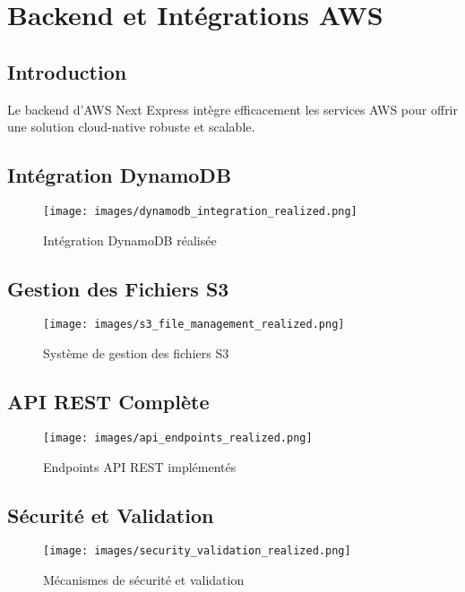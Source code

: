\section{Backend et Intégrations AWS}

\subsection{Introduction}

Le backend d'AWS Next Express intègre efficacement les services AWS pour offrir une solution cloud-native robuste et scalable.

\subsection{Intégration DynamoDB}

\begin{figure}[H]
    \centering
    \texttt{[image: images/dynamodb\_integration\_realized.png]}
    \caption{Intégration DynamoDB réalisée}
    \label{fig:dynamodb_integration}
\end{figure}

\subsection{Gestion des Fichiers S3}

\begin{figure}[H]
    \centering
    \texttt{[image: images/s3\_file\_management\_realized.png]}
    \caption{Système de gestion des fichiers S3}
    \label{fig:s3_management}
\end{figure}

\subsection{API REST Complète}

\begin{figure}[H]
    \centering
    \texttt{[image: images/api\_endpoints\_realized.png]}
    \caption{Endpoints API REST implémentés}
    \label{fig:api_endpoints}
\end{figure}

\subsection{Sécurité et Validation}

\begin{figure}[H]
    \centering
    \texttt{[image: images/security\_validation\_realized.png]}
    \caption{Mécanismes de sécurité et validation}
    \label{fig:security_validation}
\end{figure}

